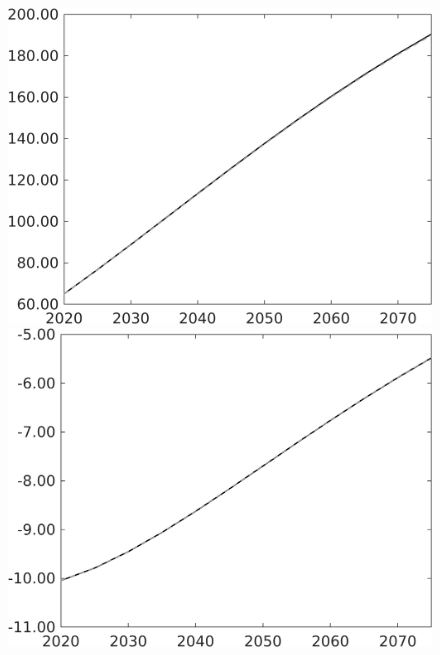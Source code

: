 \documentclass[12pt]{article}
\begin{document}
\begin{figure}[h!!]
\begin{minipage}[]{0.32\textwidth}
\end{minipage}	
\begin{minipage}[]{0.32\textwidth}
	\includegraphics[width=1\textwidth]{../../codding_model/own_basedOnFried/optimalPol_010922_revision/figures/all_13Sept22/PerdifNoTauf_Equlab_regime0_CompTaul_sg_spillover0_nsk0_xgr0_knspil1_sep1_LFlimit0_emsbase0_countec0_GovRev0_etaa0.79_lgd0.png}
\end{minipage}	
\begin{minipage}[]{0.32\textwidth}
	\includegraphics[width=1\textwidth]{../../codding_model/own_basedOnFried/optimalPol_010922_revision/figures/all_13Sept22/PerdifNoTauf_Equlab_regime0_CompTaul_wsn_spillover0_nsk0_xgr0_knspil1_sep1_LFlimit0_emsbase0_countec0_GovRev0_etaa0.79_lgd0.png}

\end{minipage}
\end{figure}
\end{document}

